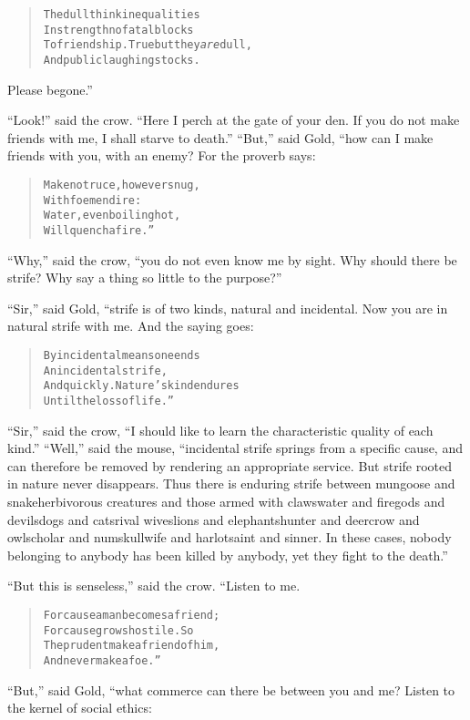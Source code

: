 \documentclass[article, twoside, 14pt]{memoir}
\renewenvironment{verbatim}{%
\begin{quote}%
\vskip -10pt%
\begin{alltt}\normalfont\large}{\end{alltt}%
\end{quote}%
\vskip -10pt
} %
\begin{document}
\begin{verbatim}
The dull think inequalities
    In strength no fatal blocks
To friendship. True{\textemdash}but they \emph{are} dull,
    And public laughingstocks.
\end{verbatim}
Please begone.”

``Look!'' said the crow.
``Here I perch at the gate of your den. If you do not make friends with me, I shall starve to death.''
``But,'' said Gold, “how can I make friends with you, with an
enemy? For the proverb says:

\begin{verbatim}
Make no truce, however snug,
    With foemen dire:
Water, even boiling hot,
    Will quench a fire.”
\end{verbatim}
``Why,'' said the crow,
``you do not even know me by sight. Why should there be strife? Why say a thing so little to the purpose?''

``Sir,'' said Gold, “strife is of two kinds, natural and
incidental. Now you are in natural strife with me. And the saying
goes:

\begin{verbatim}
By incidental means one ends
    An incidental strife,
And quickly. Nature's kind endures
    Until the loss of life.”
\end{verbatim}
``Sir,'' said the crow,
``I should like to learn the characteristic quality of each kind.''
``Well,'' said the mouse,
``incidental strife springs from a specific cause, and can therefore be removed by rendering an appropriate service. But strife rooted in nature never disappears. Thus there is enduring strife between mungoose and snake{\textemdash}herbivorous creatures and those armed with claws{\textemdash}water and fire{\textemdash}gods and devils{\textemdash}dogs and cats{\textemdash}rival wives{\textemdash}lions and elephants{\textemdash}hunter and deer{\textemdash}crow and owl{\textemdash}scholar and numskull{\textemdash}wife and harlot{\textemdash}saint and sinner. In these cases, nobody belonging to anybody has been killed by anybody, yet they fight to the death.''

``But this is senseless,'' said the crow. “Listen to me.

\begin{verbatim}
For cause a man becomes a friend;
    For cause grows hostile. So
The prudent make a friend of him,
    And never make a foe.”
\end{verbatim}
``But,'' said Gold, “what commerce can there be between you and me?
Listen to the kernel of social ethics:
\end{document}
